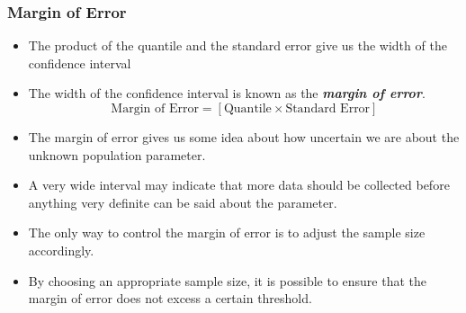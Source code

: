 \documentclass[a4]{beamer}
\begin{document}

\begin{frame}
\frametitle{Margin of Error}

\begin{itemize}
\item The product of the quantile and the standard error give us the width of the confidence interval
\item The width of the confidence interval is known as the \textbf{\emph{margin of error}}.  \[ \mbox{Margin of Error}  = \left[ \mbox{Quantile} \times \mbox{Standard Error} \right] \]
\item The margin of error gives us some idea about how uncertain we are about the unknown population parameter. \item A very wide interval may indicate that more data should be collected before anything very definite can be said about the parameter.
\item The only way to control the margin of error is to adjust the sample size accordingly.
\item By choosing an appropriate sample size, it is possible to ensure that the margin of error does not excess a certain threshold.
\end{itemize}

\end{frame}
\end{document}
